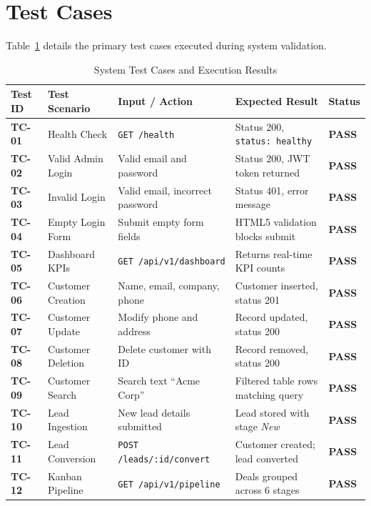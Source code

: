 \section{Test Cases}
Table~\ref{tab:test_cases} details the primary test cases executed during system validation.

\begin{table}[h!]
\centering
\caption{System Test Cases and Execution Results}
\label{tab:test_cases}
\renewcommand{\arraystretch}{1.2}
\begin{tabular}{|p{1.2cm}|p{3.2cm}|p{3.5cm}|p{3.5cm}|p{1.4cm}|}
\hline
\textbf{Test ID} & \textbf{Test Scenario} & \textbf{Input / Action} & \textbf{Expected Result} & \textbf{Status} \\ \hline
\textbf{TC-01} & Health Check & \texttt{GET /health} & Status 200, \texttt{status: healthy} & \textbf{PASS} \\ \hline
\textbf{TC-02} & Valid Admin Login & Valid email and password & Status 200, JWT token returned & \textbf{PASS} \\ \hline
\textbf{TC-03} & Invalid Login & Valid email, incorrect password & Status 401, error message & \textbf{PASS} \\ \hline
\textbf{TC-04} & Empty Login Form & Submit empty form fields & HTML5 validation blocks submit & \textbf{PASS} \\ \hline
\textbf{TC-05} & Dashboard KPIs & \texttt{GET /api/v1/dashboard} & Returns real-time KPI counts & \textbf{PASS} \\ \hline
\textbf{TC-06} & Customer Creation & Name, email, company, phone & Customer inserted, status 201 & \textbf{PASS} \\ \hline
\textbf{TC-07} & Customer Update & Modify phone and address & Record updated, status 200 & \textbf{PASS} \\ \hline
\textbf{TC-08} & Customer Deletion & Delete customer with ID & Record removed, status 200 & \textbf{PASS} \\ \hline
\textbf{TC-09} & Customer Search & Search text ``Acme Corp'' & Filtered table rows matching query & \textbf{PASS} \\ \hline
\textbf{TC-10} & Lead Ingestion & New lead details submitted & Lead stored with stage \textit{New} & \textbf{PASS} \\ \hline
\textbf{TC-11} & Lead Conversion & \texttt{POST /leads/:id/convert} & Customer created; lead converted & \textbf{PASS} \\ \hline
\textbf{TC-12} & Kanban Pipeline & \texttt{GET /api/v1/pipeline} & Deals grouped across 6 stages & \textbf{PASS} \\ \hline

\end{tabular}
\end{table}
